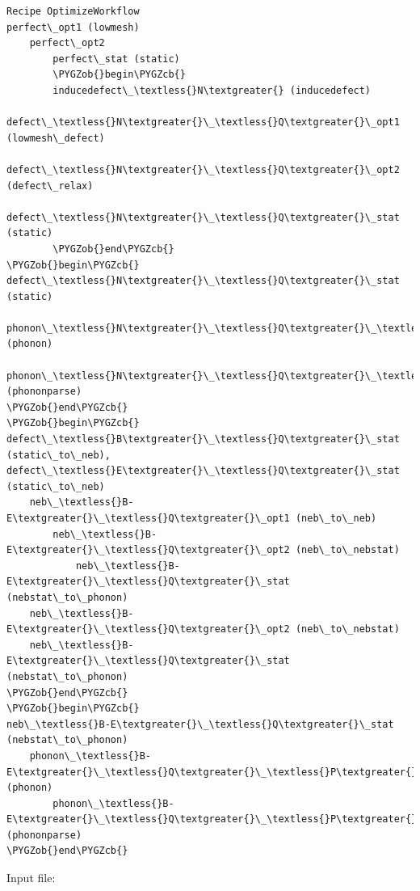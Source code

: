 \documentclass[letterpaper,10pt,english]{sphinxmanual}
\def\PYGZob{\char`\{}
\def\PYGZcb{\char`\}}
\begin{document}
\begin{Verbatim}[commandchars=\\\{\}]
Recipe OptimizeWorkflow
perfect\_opt1 (lowmesh)
    perfect\_opt2
        perfect\_stat (static)
        \PYGZob{}begin\PYGZcb{}
        inducedefect\_\textless{}N\textgreater{} (inducedefect)
            defect\_\textless{}N\textgreater{}\_\textless{}Q\textgreater{}\_opt1 (lowmesh\_defect)
                defect\_\textless{}N\textgreater{}\_\textless{}Q\textgreater{}\_opt2 (defect\_relax)
                    defect\_\textless{}N\textgreater{}\_\textless{}Q\textgreater{}\_stat (static)
        \PYGZob{}end\PYGZcb{}
\PYGZob{}begin\PYGZcb{}
defect\_\textless{}N\textgreater{}\_\textless{}Q\textgreater{}\_stat (static)
    phonon\_\textless{}N\textgreater{}\_\textless{}Q\textgreater{}\_\textless{}P\textgreater{} (phonon)
        phonon\_\textless{}N\textgreater{}\_\textless{}Q\textgreater{}\_\textless{}P\textgreater{}\_parse (phononparse)
\PYGZob{}end\PYGZcb{}
\PYGZob{}begin\PYGZcb{}
defect\_\textless{}B\textgreater{}\_\textless{}Q\textgreater{}\_stat (static\_to\_neb), defect\_\textless{}E\textgreater{}\_\textless{}Q\textgreater{}\_stat (static\_to\_neb)
    neb\_\textless{}B-E\textgreater{}\_\textless{}Q\textgreater{}\_opt1 (neb\_to\_neb)
        neb\_\textless{}B-E\textgreater{}\_\textless{}Q\textgreater{}\_opt2 (neb\_to\_nebstat)
            neb\_\textless{}B-E\textgreater{}\_\textless{}Q\textgreater{}\_stat (nebstat\_to\_phonon)
    neb\_\textless{}B-E\textgreater{}\_\textless{}Q\textgreater{}\_opt2 (neb\_to\_nebstat)
    neb\_\textless{}B-E\textgreater{}\_\textless{}Q\textgreater{}\_stat (nebstat\_to\_phonon)
\PYGZob{}end\PYGZcb{}
\PYGZob{}begin\PYGZcb{}
neb\_\textless{}B-E\textgreater{}\_\textless{}Q\textgreater{}\_stat (nebstat\_to\_phonon)
    phonon\_\textless{}B-E\textgreater{}\_\textless{}Q\textgreater{}\_\textless{}P\textgreater{} (phonon)
        phonon\_\textless{}B-E\textgreater{}\_\textless{}Q\textgreater{}\_\textless{}P\textgreater{}\_parse (phononparse)
\PYGZob{}end\PYGZcb{}
\end{Verbatim}

Input file:
\end{document}
